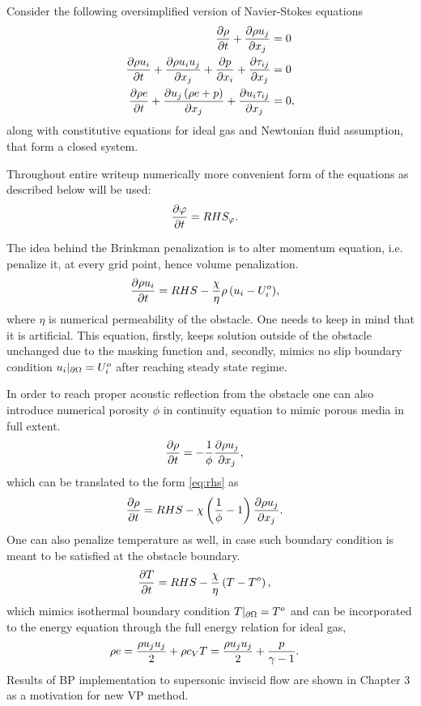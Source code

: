 Consider the following oversimplified version of Navier-Stokes equations
\begin{align}
\nonumber
\frac {\partial \rho}{\partial t} + \frac {\partial \rho u_j}{\partial x_j} &= 0 \\
\frac {\partial \rho u_i}{\partial t} + \frac {\partial \rho u_i u_j}{\partial x_j} + \frac {\partial p}{\partial x_i} + \frac {\partial \tau_{ij}}{\partial x_j} &= 0\\
\nonumber
\frac {\partial \rho e}{\partial t} + \frac {\partial u_j \left(\rho e + p\right)}{\partial x_j} + \frac {\partial u_i \tau_{ij}}{\partial x_j} &= 0,
\end{align}
along with constitutive equations for ideal gas and Newtonian fluid assumption, that form a closed system.

Throughout entire writeup numerically more convenient form of the equations as described below will be used:
\begin{align}
\frac {\partial \varphi}{\partial t} &= RHS_\varphi. \label{eq:rhs}
\end{align}

The idea behind the Brinkman penalization is to alter momentum equation, i.e. penalize it, at every grid point, hence volume penalization. 
\begin{align}
\frac {\partial \rho u_i}{\partial t} &= RHS - \frac \chi \eta {\rho \left(u_i - U_i^o\right)},
\end{align}
where $\eta$ is numerical permeability of the obstacle. One needs to keep in mind that it is artificial. This equation, firstly, keeps solution outside of the obstacle unchanged due to the masking function and, secondly, mimics no slip boundary condition $u_i|_{\partial \Omega} = U_i^o$ after reaching steady state regime. 

In order to reach proper acoustic reflection from the obstacle one can also introduce numerical porosity $\phi$ in continuity equation to mimic porous media in full extent.
\begin{align}
\nonumber
\frac {\partial \rho}{\partial t} &= -\frac 1\phi \frac {\partial \rho u_j}{\partial x_j},
\end{align}
which can be translated to the form \eqref{eq:rhs} as 
\begin{align}
\frac {\partial \rho}{\partial t} &= RHS - \chi \left(\frac 1\phi - 1\right) \frac {\partial \rho u_j}{\partial x_j}.
\end{align}
One can also penalize temperature as well, in case such boundary condition is meant to be satisfied at the obstacle boundary.
\begin{align}
\frac {\partial T}{\partial t} &= RHS - \frac \chi \eta \left(T - T^o\right),
\end{align}
which mimics isothermal boundary condition $T|_{\partial \Omega} = T^o$ and can be incorporated to the energy equation through the full energy relation for ideal gas,
\begin{align}
\rho e &= \frac {\rho u_j u_j}2 + \rho c_VT = \frac {\rho u_j u_j}2 + \frac p{\gamma - 1}.
\end{align}
Results of BP implementation to supersonic inviscid flow are shown in Chapter 3 as a motivation for new VP method.

